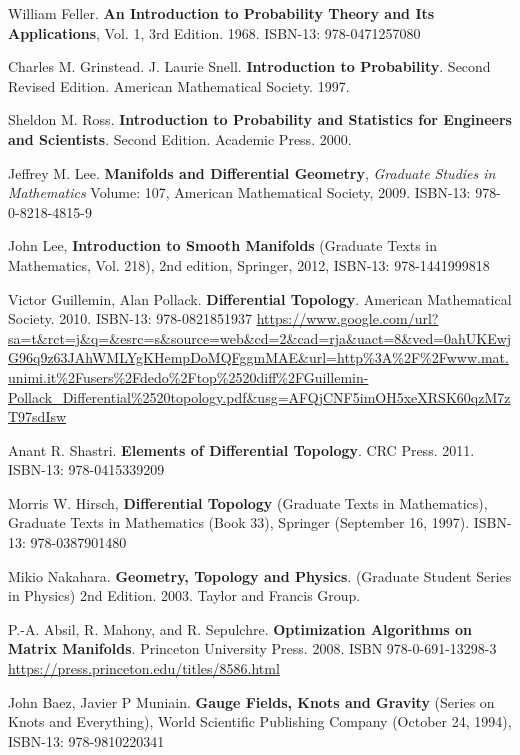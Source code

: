 \documentclass[10pt]{amsart}
\begin{document}
\begin{thebibliography}{9}

William Feller.  \textbf{An Introduction to Probability Theory and Its Applications}, Vol. 1, 3rd Edition.  1968.  ISBN-13: 978-0471257080

Charles M. Grinstead. J. Laurie Snell. \textbf{Introduction to Probability}. Second Revised Edition. American Mathematical Society. 1997.

Sheldon M. Ross. \textbf{Introduction to Probability and Statistics for Engineers and Scientists}. Second Edition. Academic Press. 2000.

Jeffrey M. Lee. \textbf{Manifolds and Differential Geometry}, \emph{Graduate Studies in Mathematics} Volume: 107, American Mathematical Society, 2009. ISBN-13: 978-0-8218-4815-9

John Lee, \textbf{Introduction to Smooth Manifolds} (Graduate Texts in Mathematics, Vol. 218), 2nd edition, Springer,  2012, ISBN-13: 978-1441999818

Victor Guillemin, Alan Pollack. \textbf{Differential Topology}. American Mathematical Society. 2010. ISBN-13: 978-0821851937
\url{https://www.google.com/url?sa=t&rct=j&q=&esrc=s&source=web&cd=2&cad=rja&uact=8&ved=0ahUKEwjG96q9z63JAhWMLYgKHempDoMQFggmMAE&url=http\%3A\%2F\%2Fwww.mat.unimi.it\%2Fusers\%2Fdedo\%2Ftop\%2520diff\%2FGuillemin-Pollack_Differential\%2520topology.pdf&usg=AFQjCNF5imOH5xeXRSK60qzM7zT97sdIsw}

Anant R. Shastri. \textbf{Elements of Differential Topology}. CRC Press. 2011. ISBN-13: 978-0415339209

Morris W. Hirsch, \textbf{Differential Topology} (Graduate Texts in Mathematics), Graduate Texts in Mathematics (Book 33), Springer (September 16, 1997). ISBN-13: 978-0387901480

Mikio Nakahara. \textbf{Geometry, Topology and Physics}. (Graduate Student Series in Physics) 2nd Edition. 2003. Taylor and Francis Group.

P.-A. Absil, R. Mahony, and R. Sepulchre.  \textbf{Optimization Algorithms on Matrix Manifolds}.  Princeton University Press.  2008.  ISBN 978-0-691-13298-3
\url{https://press.princeton.edu/titles/8586.html}  

John Baez, Javier P Muniain.  \textbf{Gauge Fields, Knots and Gravity} (Series on Knots and Everything), World Scientific Publishing Company (October 24, 1994), ISBN-13: 978-9810220341


\end{thebibliography}
\end{document}

